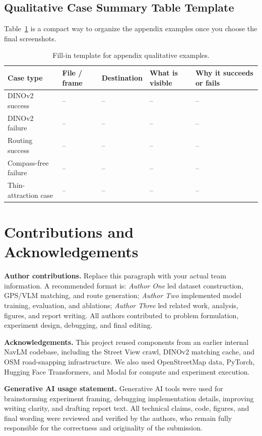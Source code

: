 \documentclass[10pt,twocolumn,letterpaper]{article}
\begin{document}
\subsection{Qualitative Case Summary Table Template}
Table~\ref{tab:qual_case_template} is a compact way to organize the appendix examples once you choose the final screenshots.

\begin{table}[t]
\centering
\small
\begin{tabular}{p{2.4cm}p{2.6cm}p{2.5cm}p{3.3cm}p{3.8cm}}
\toprule
Case type & File / frame & Destination & What is visible & Why it succeeds or fails \\
\midrule
DINOv2 success & -- & -- & -- & -- \\
DINOv2 failure & -- & -- & -- & -- \\
Routing success & -- & -- & -- & -- \\
Compass-free failure & -- & -- & -- & -- \\
Thin-attraction case & -- & -- & -- & -- \\
\bottomrule
\end{tabular}
\caption{Fill-in template for appendix qualitative examples.}
\label{tab:qual_case_template}
\end{table}

\section*{Contributions and Acknowledgements}
\textbf{Author contributions.} Replace this paragraph with your actual team information. A recommended format is: \textit{Author One} led dataset construction, GPS/VLM matching, and route generation; \textit{Author Two} implemented model training, evaluation, and ablations; \textit{Author Three} led related work, analysis, figures, and report writing. All authors contributed to problem formulation, experiment design, debugging, and final editing.

\textbf{Acknowledgements.} This project reused components from an earlier internal NavLM codebase, including the Street View crawl, DINOv2 matching cache, and OSM road-snapping infrastructure. We also used OpenStreetMap data, PyTorch, Hugging Face Transformers, and Modal for compute and experiment execution.

\textbf{Generative AI usage statement.} Generative AI tools were used for brainstorming experiment framing, debugging implementation details, improving writing clarity, and drafting report text. All technical claims, code, figures, and final wording were reviewed and verified by the authors, who remain fully responsible for the correctness and originality of the submission.

{\small


}
\end{document}
